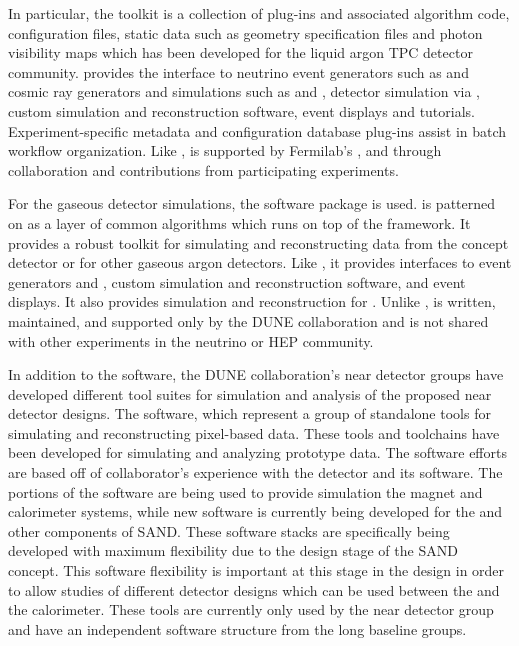 \documentclass[../main-v1.tex]{subfiles}
\begin{document}
In particular, the  toolkit is a collection of  plug-ins and associated algorithm code, configuration files, static data such as geometry specification files and photon visibility maps which has been developed for the liquid argon TPC detector community.   provides the interface to neutrino event generators such as  and cosmic ray generators and simulations such as  and , detector simulation via , custom simulation and reconstruction software, event displays and tutorials.  Experiment-specific metadata and configuration database plug-ins assist in batch workflow organization.  Like ,  is supported by Fermilab's , and through collaboration and contributions from participating experiments.

For the gaseous detector simulations, the  software package is used.   is patterned on  as a layer of common algorithms which runs on top of the  framework.  It provides a robust toolkit for simulating and reconstructing data from the  concept detector or for other gaseous argon detectors.  Like , it provides interfaces to event generators and , custom simulation and reconstruction software, and event displays.  It also provides simulation and reconstruction for .  Unlike ,  is written, maintained, and supported only by the DUNE collaboration and is not shared with other experiments in the neutrino or HEP community.

In addition to the  software, the DUNE collaboration's near detector groups have developed different tool suites for simulation and analysis of the proposed near detector designs.  The  software, which represent a group of standalone tools for simulating and reconstructing pixel-based  data.  These tools and toolchains have been developed for simulating and analyzing  prototype data.  The  software efforts are based off of collaborator's experience with the  detector and its software.  The portions of the  software are being used to provide simulation the magnet and calorimeter systems, while new software is currently being developed for the  and other components of SAND.  These software stacks are specifically being developed with maximum flexibility due to the design stage of the SAND concept.  This software flexibility is important at this stage in the design in order to allow studies of different detector designs which can be used between the  and the calorimeter.  These tools are currently only used by the near detector group and have an independent software structure from the long baseline groups.
\end{document}

